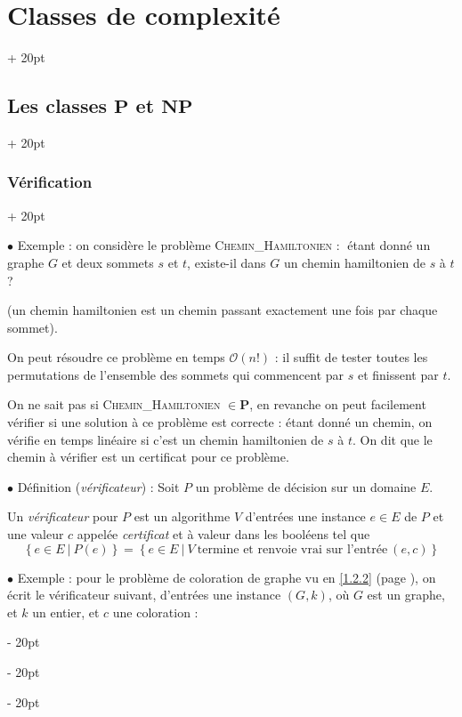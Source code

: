 \documentclass[a4paper, 12pt, twoside]{article}
\newenvironment{indalgo}[2][H]{
    \begin{algoBox}
        \begin{algorithm}[#1]
            \caption{#2}
}
{
        \end{algorithm}
    \end{algoBox}
}
\newcommand{\set}[1]{\left\{ #1 \right\}}
\newcommand{\simplecit}[1]{\guillemotleft$\;$#1$\;$\guillemotright}
\newcommand{\ind}[1][20pt]{\advance\leftskip + #1}
\newcommand{\deind}[1][20pt]{\advance\leftskip - #1}
\newenvironment{indt}[2][20pt]{#2 \par \ind[#1]}{\par \deind} %
\begin{document}
\begin{indt}{\section{Classes de complexité}}
\begin{indt}{\subsection{Les classes $\mathbf P$ et $\mathbf{NP}$}}
            \vspace{12pt}
            
            \begin{indt}{\subsubsection{Vérification}}
                \label{2.2.2}

                $\bullet$ Exemple : on considère le problème \textsc{Chemin\_Hamiltonien} : \simplecit{étant donné un graphe $G$ et deux sommets $s$ et $t$, existe-il dans $G$ un chemin hamiltonien de $s$ à $t$ ?}

                (un chemin hamiltonien est un chemin passant exactement une fois par chaque sommet).

                On peut résoudre ce problème en temps $\mathcal O(n!)$ : il suffit de tester toutes les permutations de l'ensemble des sommets qui commencent par $s$ et finissent par $t$.

                On ne sait pas si \textsc{Chemin\_Hamiltonien} $\in \mathbf P$, en revanche on peut facilement vérifier si une solution à ce problème est correcte : étant donné un chemin, on vérifie en temps linéaire si c'est un chemin hamiltonien de $s$ à $t$.
                On dit que le chemin à vérifier est un certificat pour ce problème.

                \vspace{12pt}
                
                $\bullet$ Définition (\emph{vérificateur}) :
                Soit $P$ un problème de décision sur un domaine $E$.

                Un \emph{vérificateur} pour $P$ est un algorithme $V$ d'entrées une instance $e \in E$ de $P$ et une valeur $c$ appelée \emph{certificat} et à valeur dans les booléens tel que
                \[
                    \set{e \in E\ |\ P(e)}
                    = \set{e \in E \ |\ V\ \text{termine et renvoie vrai sur l'entrée}\ (e, c)}
                \]

                \vspace{12pt}
                
                $\bullet$ Exemple : pour le problème de coloration de graphe vu en \ref{1.2.2} (page \pageref{1.2.2}), on écrit le vérificateur suivant, d'entrées une instance $(G, k)$, où $G$ est un graphe, et $k$ un entier, et $c$ une coloration :

                \begin{indalgo}{Vérificateur du problème de coloration}


\end{indalgo}
\end{indt}
\end{indt}
\end{indt}
\end{document}
